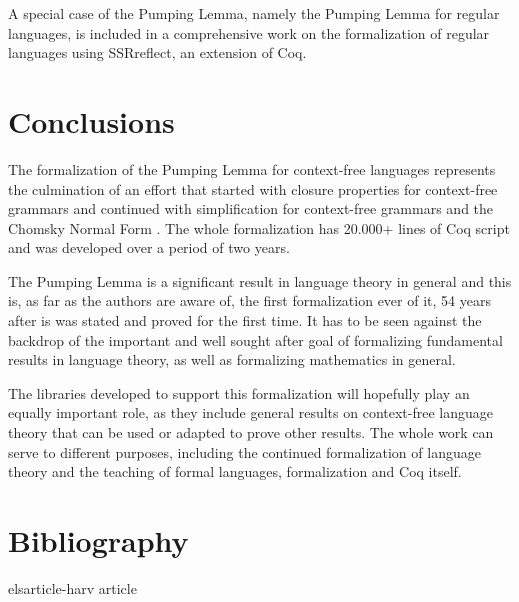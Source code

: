\documentclass {elsarticle}
\begin{document}
A special case of the Pumping Lemma, namely the Pumping Lemma for regular languages, is included in a comprehensive work on the formalization of regular languages \cite {doczkal-2013} using SSRreflect, an extension of Coq.

\section {Conclusions}
\label {sec-conclusions}

The formalization of the Pumping Lemma for context-free languages represents the culmination of an effort that started with closure properties for context-free grammars \cite {ramos-2014} and continued with simplification for context-free grammars \cite {ramos-2015} and the Chomsky Normal Form \cite {ramos-2016}. The whole formalization has 20.000+ lines of Coq script and was developed over a period of two years.

The Pumping Lemma is a significant result in language theory in general and this is, as far as the authors are aware of, the first formalization ever of it, 54 years after is was stated and proved for the first time. It has to be seen against the backdrop of the important and well sought after goal of formalizing fundamental results in language theory, as well as formalizing mathematics in general.

The libraries developed to support this formalization will hopefully play an equally important role, as they include general results on context-free language theory that can be used or adapted to prove other results. The whole work can serve to different purposes, including the continued formalization of language theory and the teaching of formal languages, formalization and Coq itself.

\section*{Bibliography}
 {elsarticle-harv}
 {article}
\end{document}
